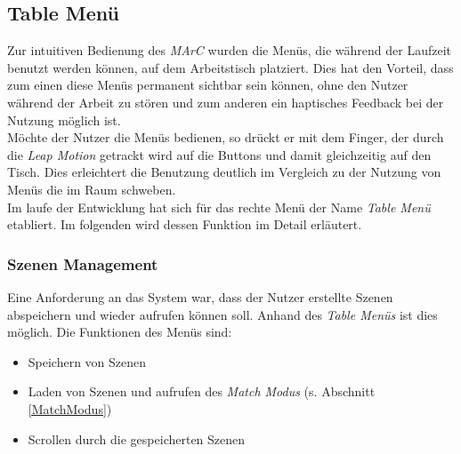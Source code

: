 \subsection{Table Menü}\label{sec:TableMenü}

Zur intuitiven Bedienung des \textit{MArC} wurden die Menüs, die während der Laufzeit benutzt werden können, auf dem Arbeitstisch platziert. Dies hat den Vorteil, dass zum einen diese Menüs permanent sichtbar sein können, ohne den Nutzer während der Arbeit zu stören und zum anderen ein haptisches Feedback bei der Nutzung möglich ist.\\
Möchte der Nutzer die Menüs bedienen, so drückt er mit dem Finger, der durch die \textit{Leap Motion} getrackt wird auf die Buttons und damit gleichzeitig auf den Tisch. Dies erleichtert die Benutzung deutlich im Vergleich zu der Nutzung von Menüs die im Raum schweben.\\
Im laufe der Entwicklung hat sich für das rechte Menü der Name \textit{Table Menü} etabliert. Im folgenden wird dessen Funktion im Detail erläutert.

\subsubsection{Szenen Management}
Eine Anforderung an das System war, dass der Nutzer erstellte Szenen abspeichern und wieder aufrufen können soll. Anhand des \textit{Table Menüs} ist dies möglich. Die Funktionen des Menüs sind:
\begin{itemize}
	\item Speichern von Szenen
	\item Laden von Szenen und aufrufen des \textit{Match Modus} (s. Abschnitt \ref{MatchModus})
	\item Scrollen durch die gespeicherten Szenen

\end{itemize}



